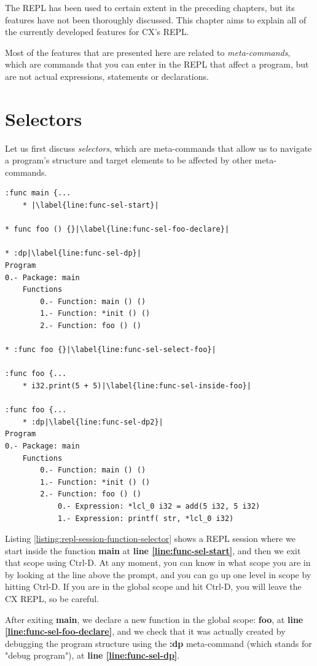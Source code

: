 \documentclass[11pt,fleqn,openany]{book} %
\begin{document}
The REPL has been used to certain extent in the preceding chapters, but its features have not been thoroughly discussed. This chapter aims to explain all of the currently developed features for CX's REPL.

Most of the features that are presented here are related to \emph{meta-commands}, which are commands that you can enter in the REPL that affect a program, but are not actual expressions, statements or declarations.

\section{Selectors}

Let us first discuss \emph{selectors}, which are meta-commands that allow us to navigate a program's structure and target elements to be affected by other meta-commands.

\begin{lstlisting}[caption={REPL function selection meta-command},captionpos=b,label={listing:repl-session-function-selector}]
:func main {...
	* |\label{line:func-sel-start}|

* func foo () {}|\label{line:func-sel-foo-declare}|

* :dp|\label{line:func-sel-dp}|
Program
0.- Package: main
	Functions
		0.- Function: main () ()
		1.- Function: *init () ()
		2.- Function: foo () ()

* :func foo {}|\label{line:func-sel-select-foo}|

:func foo {...
	* i32.print(5 + 5)|\label{line:func-sel-inside-foo}|
    
:func foo {...
	* :dp|\label{line:func-sel-dp2}|
Program
0.- Package: main
	Functions
		0.- Function: main () ()
		1.- Function: *init () ()
		2.- Function: foo () ()
			0.- Expression: *lcl_0 i32 = add(5 i32, 5 i32)
			1.- Expression: printf( str, *lcl_0 i32)
\end{lstlisting}

Listing \ref{listing:repl-session-function-selector} shows a REPL session where we start inside the function \textbf{main} at \textbf{line \ref{line:func-sel-start}}, and then we exit that scope using Ctrl-D. At any moment, you can know in what scope you are in by looking at the line above the prompt, and you can go up one level in scope by hitting Ctrl-D. If you are in the global scope and hit Ctrl-D, you will leave the CX REPL, so be careful.

After exiting \textbf{main}, we declare a new function in the global scope: \textbf{foo}, at \textbf{line \ref{line:func-sel-foo-declare}}, and we check that it was actually created by debugging the program structure using the \textbf{:dp} meta-command (which stands for "debug program"), at \textbf{line \ref{line:func-sel-dp}}.
\end{document}
